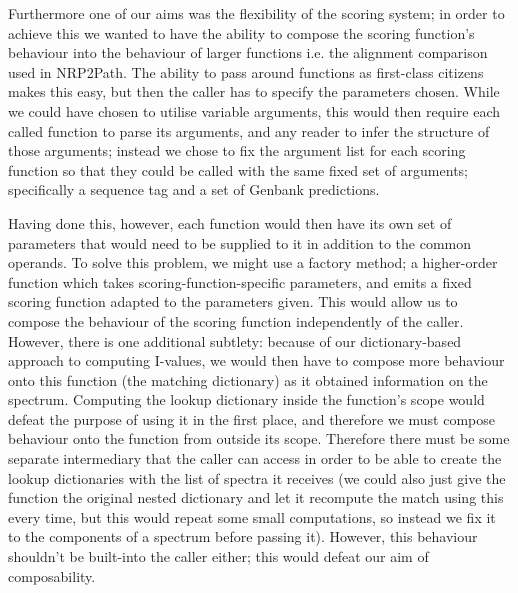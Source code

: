 \documentclass{l4proj}
\begin{document}
Furthermore one of our aims was the flexibility of the scoring system; in order to achieve this we wanted to have the ability to compose the scoring function's behaviour into the behaviour of larger functions i.e. the alignment comparison used in NRP2Path. The ability to pass around functions as first-class citizens makes this easy, but then the caller has to specify the parameters chosen. While we could have chosen to utilise variable arguments, this would then require each called function to parse its arguments, and any reader to infer the structure of those arguments; instead we chose to fix the argument list for each scoring function so that they could be called with the same fixed set of arguments; specifically a sequence tag and a set of Genbank predictions.

Having done this, however, each function would then have its own set of parameters that would need to be supplied to it in addition to the common operands. To solve this problem, we might use a factory method; a higher-order function which takes scoring-function-specific parameters, and emits a fixed scoring function adapted to the parameters given. This would allow us to compose the behaviour of the scoring function independently of the caller. However, there is one additional subtlety: because of our dictionary-based approach to computing I-values, we would then have to compose more behaviour onto this function (the matching dictionary) as it obtained information on the spectrum. Computing the lookup dictionary inside the function's scope would defeat the purpose of using it in the first place, and therefore we must compose behaviour onto the function from outside its scope. Therefore there must be some separate intermediary that the caller can access in order to be able to create the lookup dictionaries with the list of spectra it receives (we could also just give the function the original nested dictionary and let it recompute the match using this every time, but this would repeat some small computations, so instead we fix it to the components of a spectrum before passing it). However, this behaviour shouldn't be built-into the caller either; this would defeat our aim of composability. 
\end{document}

